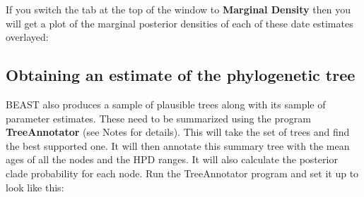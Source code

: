 \documentclass[12pt]{article}
\begin{document}

\medskip{}

If you switch the tab at the top of the window to {\bf Marginal Density} then you will get a plot of the marginal posterior densities of each of these date estimates overlayed:

\medskip{}


\medskip{}

\subsection*{Obtaining an estimate of the phylogenetic tree}

BEAST also produces a sample of plausible trees along with its sample of parameter estimates. 
These need to be summarized
using the program {\bf TreeAnnotator} (see Notes for details). This will take the set of trees and find the best
supported one. It will then annotate this summary tree with the mean ages of all the
nodes and the HPD ranges. It will also calculate the posterior clade probability for each
node. Run the TreeAnnotator program and set it up to look like this:
\end{document}
